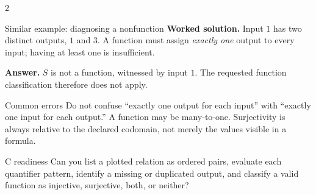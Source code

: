 \documentclass[10pt]{article}
\begin{document}
\begin{multicols}{2}
\begin{workedbox}{Similar example: diagnosing a nonfunction}
\textbf{Worked solution.} Input $1$ has two distinct outputs, $1$ and $3$.
A function must assign \emph{exactly one} output to every input; having at least
one is insufficient.

\textbf{Answer.} $S$ is not a function, witnessed by input $1$. The requested
function classification therefore does not apply.
\end{workedbox}

\begin{warningbox}{Common errors}
Do not confuse ``exactly one output for each input'' with ``exactly one input
for each output.'' A function may be many-to-one. Surjectivity is always
relative to the declared codomain, not merely the values visible in a formula.
\end{warningbox}

\begin{checklistbox}{C readiness}
Can you list a plotted relation as ordered pairs, evaluate each quantifier
pattern, identify a missing or duplicated output, and classify a valid function
as injective, surjective, both, or neither?
\end{checklistbox}
\end{multicols}

\bigskip
\thispagestyle{fancy}
\end{document}
